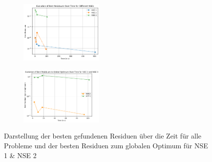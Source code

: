 \documentclass{article}
\theoremstyle{newline}
\begin{document}
\begin{onehalfspace}
\begin{figure}[h]
	\centering
	\begin{subfigure}
		\centering
		\includegraphics[width=0.45\textwidth]{Bilder/BestResiduum_Time_nse1-3.png}
		\label{fig:bestresiduum_time_allnse}
	\end{subfigure}
	\hfill
	\begin{subfigure}
		\centering
		\includegraphics[width=0.45\textwidth]{Bilder/Residuum_globaloptimum_time_nse2-3.png}
		\label{fig:bestresiduum_globaloptimum_time_nse1-2}
	\end{subfigure}
	\caption{Darstellung der besten gefundenen Residuen über die Zeit für alle Probleme und der besten Residuen zum globalen Optimum für NSE 1 \& NSE 2}
	\label{fig:zusammenstellung}
\end{figure}


\end{onehalfspace}
\end{document}
